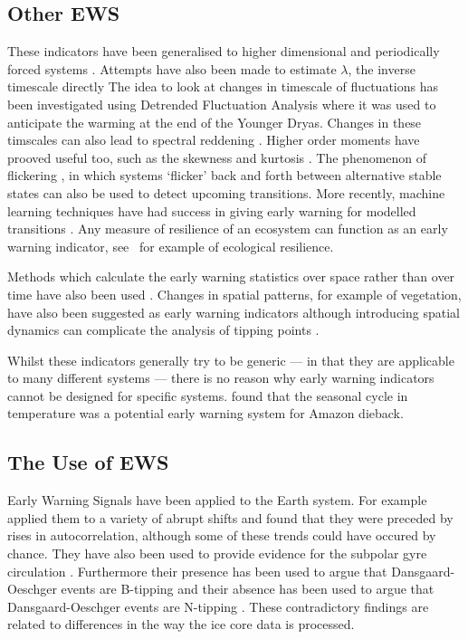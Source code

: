 \subsection{Other EWS}
These indicators have been generalised to higher dimensional and periodically forced systems \parencite{Williamson2015,Williamson2016}. Attempts have also been made to estimate
$\lambda$, the inverse timescale directly \parencite{Boettner2022,Boers2021a} The idea to look at
changes in timescale of fluctuations has been investigated using Detrended Fluctuation Analysis \parencite{Livina2007} where it was used to anticipate the warming at the
end of the Younger Dryas. Changes in these timscales can also lead to spectral reddening \parencite{Kleinen2003}. Higher order moments have prooved useful too, such as the
skewness \parencite{Guttal2008} and kurtosis \parencite{Xie2019}. The phenomenon of flickering \parencite{Wang2012}, in which systems `flicker' back and forth between alternative stable
states can also be used to detect upcoming transitions. More recently, machine learning techniques have had success in giving early warning for modelled transitions \parencite{Bury2021}.
Any measure of resilience of an ecosystem can function as an early warning indicator, see~\cite{Krakovska2023} for example of ecological resilience.


Methods which calculate the early warning statistics over space rather than over time have also been used \parencite{Donangelo2010,Guttal2009}. Changes in spatial
patterns, for example of vegetation, have also been suggested as early warning indicators \parencite{Kefi2007,Kefi2014} although introducing spatial dynamics can complicate the analysis
of tipping points \parencite{Rietkerk2021}.

Whilst these indicators generally try to be generic --- in that they are applicable to many different systems --- there is no reason why early warning indicators cannot be designed for specific systems.
\cite{Parry2022} found that the seasonal cycle in temperature was a potential early warning system for Amazon dieback.

\subsection{The Use of EWS}
Early Warning Signals have been applied to the Earth system. For example~\cite{Dakos2008} applied them to a variety of abrupt shifts and found that they were preceded by rises in autocorrelation,
although some of these trends could have occured by chance. They have also been used to provide evidence for the subpolar gyre circulation \parencite{Arellano-Nava2022}. Furthermore their presence has been
used to argue that Dansgaard-Oeschger events are B-tipping \parencite{Boers2018a} and their absence has been used to argue that Dansgaard-Oeschger events are N-tipping \parencite{Ditlevsen2010}. These contradictory findings
are related to differences in the way the ice core data is processed.


